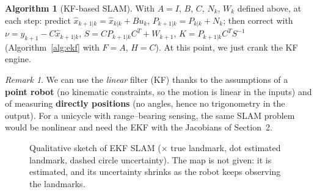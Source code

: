 \documentclass[11pt,a4paper]{article}
\def\bm#1{#1}%
\newcommand{\robot}[3][fill=white]{\begin{scope}[shift={(#2)},rotate=#3]\draw[#1,thick] (0.24,0)--(-0.16,0.15)--(-0.16,-0.15)--cycle;\end{scope}}
\theoremstyle{definition}
\newtheorem{algorithm}[definition]{Algorithm}
\theoremstyle{plain}
\theoremstyle{remark}
\newtheorem*{remark}{Remark}
\begin{document}
\begin{algorithm}[KF-based SLAM]
With $\bm A=\bm I$, $\bm B$, $\bm C$, $\bm N_k$, $\bm W_k$ defined above, at each step: predict $\hat{\bm x}_{k+1|k}=\hat{\bm x}_{k|k}+\bm B\bm u_k$, $\bm P_{k+1|k}=\bm P_{k|k}+\bm N_k$; then correct with $\bm\nu=\bm y_{k+1}-\bm C\hat{\bm x}_{k+1|k}$, $\bm S=\bm C\bm P_{k+1|k}\bm C^T+\bm W_{k+1}$, $\bm K=\bm P_{k+1|k}\bm C^T\bm S^{-1}$ (Algorithm~\ref{alg:ekf} with $\bm F=\bm A$, $\bm H=\bm C$). At this point, we just crank the KF engine.
\end{algorithm}

\begin{remark}
We can use the \emph{linear} filter (KF) thanks to the assumptions of a \textbf{point robot} (no kinematic constraints, so the motion is linear in the inputs) and of measuring \textbf{directly positions} (no angles, hence no trigonometry in the output). For a unicycle with range--bearing sensing, the same SLAM problem would be nonlinear and need the EKF with the Jacobians of Section~2.
\end{remark}

\begin{figure}[H]
\centering
\begin{minipage}[t]{0.48\linewidth}
\centering
{}
\end{minipage}\hfill
\begin{minipage}[t]{0.48\linewidth}
\centering
{}
\end{minipage}
\caption{Qualitative sketch of EKF SLAM ($\times$ true landmark, dot estimated landmark, dashed circle uncertainty). The map is not given: it is estimated, and its uncertainty shrinks as the robot keeps observing the landmarks.}
\label{fig:slam}
\end{figure}
\end{document}
